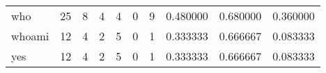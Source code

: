 \begin{longtable}{lrrrrrrrrr}
who       &                                      25 &                                                  8 &                                                  4 &                                                  4 &                                                  0 &                                                  9 &                                           0.480000 &                               0.680000 &                             0.360000 \\
whoami    &                                      12 &                                                  4 &                                                  2 &                                                  5 &                                                  0 &                                                  1 &                                           0.333333 &                               0.666667 &                             0.083333 \\
yes       &                                      12 &                                                  4 &                                                  2 &                                                  5 &                                                  0 &                                                  1 &                                           0.333333 &                               0.666667 &                             0.083333 \\
\end{longtable}

